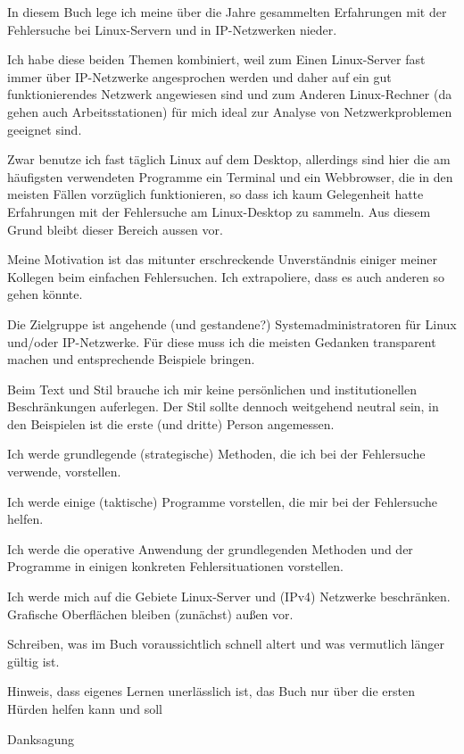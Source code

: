 \begin{normaltext}
  In diesem Buch lege ich meine über die Jahre gesammelten Erfahrungen mit
  der Fehlersuche bei Linux-Servern und in IP-Netzwerken nieder.

  Ich habe diese beiden Themen kombiniert, weil zum Einen Linux-Server fast
  immer über IP-Netzwerke angesprochen werden und daher auf ein gut
  funktionierendes Netzwerk angewiesen sind und zum Anderen Linux-Rechner
  (da gehen auch Arbeitsstationen) für mich ideal zur Analyse von
  Netzwerkproblemen geeignet sind.

  Zwar benutze ich fast täglich Linux auf dem Desktop, allerdings sind hier
  die am häufigsten verwendeten Programme ein Terminal und ein Webbrowser, die
  in den meisten Fällen vorzüglich funktionieren, so dass ich kaum Gelegenheit
  hatte Erfahrungen mit der Fehlersuche am Linux-Desktop zu sammeln. Aus
  diesem Grund bleibt dieser Bereich aussen vor.
\end{normaltext}
\begin{notes}
\item Meine Motivation ist das mitunter erschreckende Unverständnis einiger
  meiner Kollegen beim einfachen Fehlersuchen. Ich extrapoliere, dass es auch
  anderen so gehen könnte.
\item Die Zielgruppe ist angehende (und gestandene?) Systemadministratoren für
  Linux und/oder IP-Netzwerke. Für diese muss ich die meisten Gedanken
  transparent machen und entsprechende Beispiele bringen.
\item Beim Text und Stil brauche ich mir keine persönlichen und
  institutionellen Beschränkungen auferlegen. Der Stil sollte dennoch
  weitgehend neutral sein, in den Beispielen ist die erste (und dritte)
  Person angemessen.
\item Ich werde grundlegende (strategische) Methoden, die ich bei der
  Fehlersuche verwende, vorstellen.
\item Ich werde einige (taktische) Programme vorstellen, die mir bei der
  Fehlersuche helfen.
\item Ich werde die operative Anwendung der grundlegenden Methoden und der
  Programme in einigen konkreten Fehlersituationen vorstellen.
\item Ich werde mich auf die Gebiete Linux-Server und (IPv4) Netzwerke
  beschränken. Grafische Oberflächen bleiben (zunächst) außen vor.
\item Schreiben, was im Buch voraussichtlich schnell altert und was vermutlich
  länger gültig ist.
\item Hinweis, dass eigenes Lernen unerlässlich ist, das Buch nur über die
  ersten Hürden helfen kann und soll
\item Danksagung
\end{notes}

